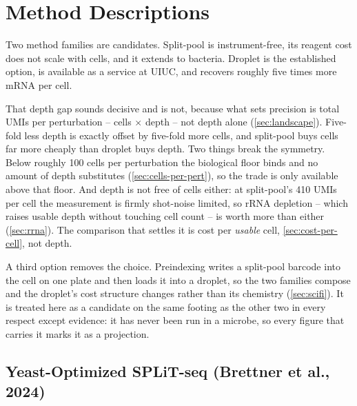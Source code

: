 
\section{Method Descriptions}
\label{sec:methods}

Two method families are candidates. Split-pool is instrument-free, its reagent
cost does not scale with cells, and it extends to bacteria. Droplet is the
established option, is available as a service at UIUC, and recovers roughly five
times more mRNA per cell.

That depth gap sounds decisive and is not, because what sets precision is total
UMIs per perturbation -- cells $\times$ depth -- not depth alone
(\cref{sec:landscape}). Five-fold less depth is exactly offset by five-fold more
cells, and split-pool buys cells far more cheaply than droplet buys depth. Two
things break the symmetry. Below roughly 100 cells per perturbation the
biological floor binds and no amount of depth substitutes
(\cref{sec:cells-per-pert}), so the trade is only available above that floor. And
depth is not free of cells either: at split-pool's 410 UMIs per cell the
measurement is firmly shot-noise limited, so rRNA depletion -- which raises
usable depth without touching cell count -- is worth more than either
(\cref{sec:rrna}). The comparison that settles it is cost per \emph{usable} cell,
\cref{sec:cost-per-cell}, not depth.

A third option removes the choice. Preindexing writes a split-pool barcode into
the cell on one plate and then loads it into a droplet, so the two families
compose and the droplet's cost structure changes rather than its chemistry
(\cref{sec:scifi}). It is treated here as a candidate on the same footing as the
other two in every respect except evidence: it has never been run in a microbe,
so every figure that carries it marks it as a projection.


\subsection{Yeast-Optimized SPLiT-seq (Brettner et al., 2024)}
\label{sec:brettner}

